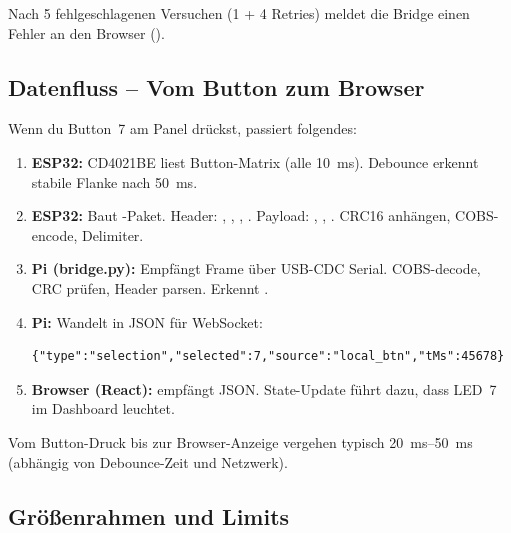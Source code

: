 \begin{warnbox}[Fehlerbehandlung]
Nach 5 fehlgeschlagenen Versuchen (1 + 4 Retries) meldet die Bridge einen Fehler
an den Browser ().
\end{warnbox}

\subsection{Datenfluss -- Vom Button zum Browser}
\label{subsec:datenfluss}

Wenn du Button~7 am Panel drückst, passiert folgendes:

\begin{enumerate}
\item \textbf{ESP32:} CD4021BE liest Button-Matrix (alle \SI{10}{\milli\second}).
      Debounce erkennt stabile Flanke nach \SI{50}{\milli\second}.

\item \textbf{ESP32:} Baut -Paket.
      Header: , , , .
      Payload: , , .
      CRC16 anhängen, COBS-encode,  Delimiter.

\item \textbf{Pi (bridge.py):} Empfängt Frame über USB-CDC Serial.
      COBS-decode, CRC prüfen, Header parsen. Erkennt .

\item \textbf{Pi:} Wandelt in JSON für WebSocket:
\begin{lstlisting}[style=json]
{"type":"selection","selected":7,"source":"local_btn","tMs":45678}
\end{lstlisting}

\item \textbf{Browser (React):}  empfängt JSON.
      State-Update führt dazu, dass LED~7 im Dashboard leuchtet.
\end{enumerate}

\begin{infobox}[Latenz]
Vom Button-Druck bis zur Browser-Anzeige vergehen typisch \SIrange{20}{50}{\milli\second}
(abhängig von Debounce-Zeit und Netzwerk).
\end{infobox}

\subsection{Größenrahmen und Limits}
\label{subsec:groessenrahmen}

